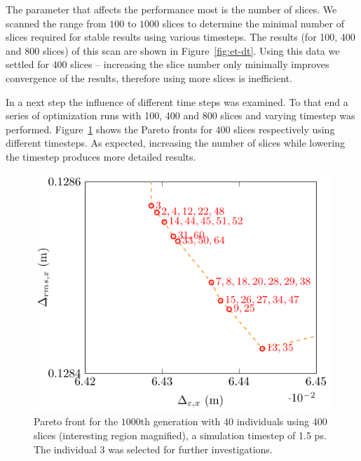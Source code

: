 The parameter that affects the performance most is the number of slices.
We scanned the range from $100$ to $1000$ slices to determine the minimal
  number of slices required for stable results using various timesteps.
The results (for 100, 400 and 800 slices) of this scan are shown in
  Figure~\ref{fig:et-dt}.
Using this data we settled for $400$ slices -- increasing the slice number
  only minimally improves convergence of the results, therefore using more
  slices is inefficient.



In a next step the influence of different time steps was examined.
To that end a series of optimization runs with 100, 400 and 800 slices and
  varying timestep was performed.
Figure~\ref{fig:pareto_front_21} shows the Pareto fronts for 400 slices
  respectively using different timesteps.
As expected, increasing the number of slices while lowering the timestep
  produces more detailed results.


\begin{figure}%
  \centering
    \includegraphics[width=0.8\linewidth]{Report/front_plot}
  \caption{Pareto front for the $1000$th generation with $40$ individuals
    using 400 slices (interesting region magnified), a simulation timestep
    of 1.5 ps.
    The individual 3 was selected for further investigations.}
  \label{fig:pareto_front_21}
\end{figure}


